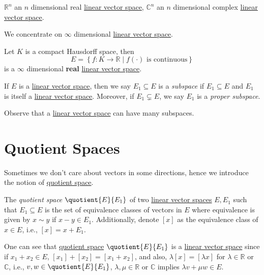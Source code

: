 \begin{eg}
	\(\mathbb{R} ^n\) an \(n\) dimensional real \hyperref[def:linear-vector-space]{linear vector space}, \(\mathbb{C} ^n\) an \(n\) dimensional complex \hyperref[def:linear-vector-space]{linear vector space}.
\end{eg}

We concentrate on \(\infty \) dimensional \hyperref[def:linear-vector-space]{linear vector space}.

\begin{eg}
	Let \(K\) is a compact Hausdorff space, then
	\[
		E = \left\{ f\colon K\to \mathbb{R} \mid f(\cdot) \text{ is continuous}  \right\}
	\]
	is a \(\infty\) dimensional \textbf{real} \hyperref[def:linear-vector-space]{linear vector space}.
\end{eg}

\begin{notation}[Subspace]
	If \(E\) is a \hyperref[def:linear-vector-space]{linear vector space}, then we say \(E_1 \subseteq E\) is a \emph{subspace} if \(E_1 \subseteq E\) and \(E_1\) is itself a \hyperref[def:linear-vector-space]{linear vector space}. Moreover, if \(E_1 \subsetneq E\), we say \(E_1\) is a \emph{proper subspace}.
\end{notation}

Observe that a \hyperref[def:linear-vector-space]{linear vector space} can have many subspaces.

\section{Quotient Spaces}
Sometimes we don't care about vectors in some directions, hence we introduce the notion of \hyperref[def:quotient-space]{quotient space}.

\begin{definition}\label{def:quotient-space}
	The \emph{quotient space} \(\quotient{E}{E_1} \) of two \hyperref[def:linear-vector-space]{linear vector spaces} \(E, E_1\) such that \(E_1 \subseteq E\) is the set of equivalence classes of vectors in \(E\) where equivalence is given by \(x\sim y\) if \(x - y\in E_1\). Additionally, denote \([x]\) as the equivalence class of \(x\in E\), i.e., \([x] = x + E_1\).
\end{definition}

One can see that \hyperref[def:quotient-space]{quotient space} \(\quotient{E}{E_1} \) is a \hyperref[def:linear-vector-space]{linear vector space} since if \(x_1 + x_2\in E\), \([x_1] + [x_2] = [x_1 + x_2]\), and also, \(\lambda [x] = [\lambda x]\) for \(\lambda \in \mathbb{R} \) or \(\mathbb{C} \), i.e., \(v, w\in \quotient{E}{E_1} \), \(\lambda , \mu \in\mathbb{R} \) or \(\mathbb{C} \) implies \(\lambda v + \mu w\in E\).

